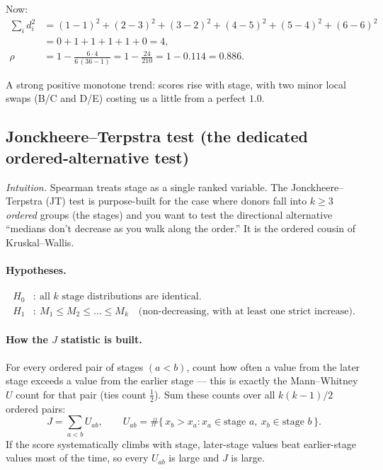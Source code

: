 \documentclass[11pt]{article}
\begin{document}
Now:
\begin{align*}
\sum_i d_i^2 &= (1-1)^2+(2-3)^2+(3-2)^2+(4-5)^2+(5-4)^2+(6-6)^2 \\
             &= 0+1+1+1+1+0 = 4, \\[0.4em]
\rho &= 1 - \frac{6\cdot 4}{6\,(36-1)} = 1 - \frac{24}{210} = 1 - 0.114 = 0.886.
\end{align*}

A strong positive monotone trend: scores rise with stage, with two minor local swaps (B/C and D/E) costing us a little from a perfect $1.0$.

\subsection{Jonckheere--Terpstra test (the dedicated ordered-alternative test)}

\textit{Intuition.} Spearman treats stage as a single ranked variable. The Jonckheere--Terpstra (JT) test is purpose-built for the case where donors fall into $k \ge 3$ \emph{ordered} groups (the stages) and you want to test the directional alternative ``medians don't decrease as you walk along the order.'' It is the ordered cousin of Kruskal--Wallis.

\paragraph{Hypotheses.}
\begin{align*}
H_0&:\ \text{all } k \text{ stage distributions are identical.}\\
H_1&:\ M_1 \le M_2 \le \dots \le M_k \quad \text{(non-decreasing, with at least one strict increase).}
\end{align*}

\paragraph{How the $J$ statistic is built.} For every ordered pair of stages $(a < b)$, count how often a value from the later stage exceeds a value from the earlier stage --- this is exactly the Mann--Whitney $U$ count for that pair (ties count $\tfrac12$). Sum these counts over all $k(k-1)/2$ ordered pairs:
\[
J = \sum_{a<b} U_{ab}, \qquad U_{ab} = \#\{\, x_b > x_a : x_a \in \text{stage } a,\ x_b \in \text{stage } b \,\}.
\]
If the score systematically climbs with stage, later-stage values beat earlier-stage values most of the time, so every $U_{ab}$ is large and $J$ is large.
\end{document}
